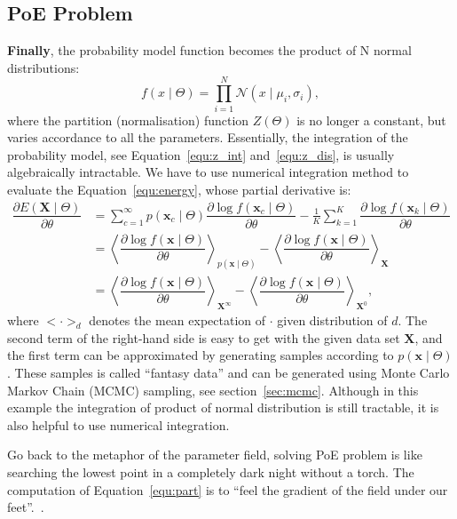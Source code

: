 \documentclass[11pt,twoside,a4paper]{article}
\begin{document}
\subsection{PoE Problem}
	\textbf{Finally}, the probability model function becomes the product of N normal distributions: 
	\begin{equation}
	f(x \mid \Theta ) = \prod_{i=1}^N\mathcal{N}(x \mid \mu_i, \sigma_i ),
	\end{equation}
	where the partition (normalisation) function $Z( \Theta)$ is no longer a constant, but varies accordance to all the parameters.
	Essentially, the integration of the probability model, see Equation~\ref{equ:z_int} and~\ref{equ:z_dis}, is usually algebraically intractable.
	We have to use numerical integration method to evaluate the Equation~\ref{equ:energy}, whose partial derivative is:
	\begin{equation}
	\label{equ:part}
	\begin{aligned}
	\dfrac{\partial E(\mathbf{X} \mid \Theta)}{\partial \theta} 
	& = \sum_{c=1}^{\infty} p(\mathbf{x}_c \mid \Theta) \dfrac{\partial \log f(\mathbf{x}_c \mid \Theta)}{\partial \theta} - \frac{1}{K}\sum_{k=1}^K \dfrac{\partial \log f(\mathbf{x}_k \mid \Theta)}{\partial \theta} \\
	& = \left \langle \dfrac{\partial \log f(\mathbf{x} \mid \Theta)}{\partial \theta}\right \rangle_{p(\mathbf{x} \mid \Theta)} - 
	\left \langle \dfrac{\partial \log f(\mathbf{x} \mid \Theta)}{\partial \theta}\right \rangle_{\mathbf{X}} \\
	&=\left \langle \dfrac{\partial \log f(\mathbf{x} \mid \Theta)}{\partial \theta}\right \rangle_{\mathbf{X}^\infty} - \left \langle \dfrac{\partial \log f(\mathbf{x} \mid \Theta)}{\partial \theta}\right \rangle_{\mathbf{X}^0},
	\end{aligned}
	\end{equation}
	where  $ <\cdot>_d $ denotes the mean expectation of $ \cdot $ given distribution of $d$.
	The second term of the right-hand side is easy to get with the given data set $ \mathbf{X} $, and the first term can be approximated by generating samples according to $ p(\mathbf{x} \mid \Theta) $.
	These samples is called ``fantasy data'' and can be generated using Monte Carlo Markov Chain (MCMC) sampling, see section~\ref{sec:mcmc}.
	Although in this example the integration of product of normal distribution is still tractable, it is also helpful to use numerical integration.

	Go back to the metaphor of the parameter field, solving PoE problem is like searching the lowest point in a completely dark night without a torch.
	The computation of Equation~\ref{equ:part} is to ``feel the gradient of the field under our feet''.~\cite{woodfordnotes}.
\end{document}
